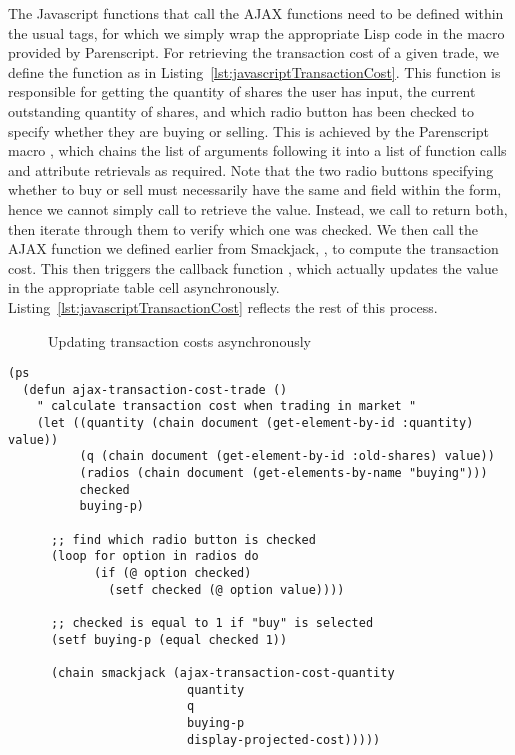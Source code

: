 The Javascript functions that call the AJAX functions need to be defined within
the usual  tags, for which we simply wrap the appropriate Lisp
code in the  macro provided by Parenscript. For retrieving
the transaction cost of a given trade, we define the function
 as in
Listing~\ref{lst:javascriptTransactionCost}. This function is responsible for
getting the quantity of shares the user has input, the current outstanding
quantity of shares, and which radio button has been checked to specify whether
they are buying or selling. This is achieved by the Parenscript macro
, which chains the list of arguments following it into a list of
function calls and attribute retrievals as required. Note that the two radio
buttons specifying whether to buy or sell must necessarily have the same
 and  field within the form, hence we cannot simply call
 to retrieve the value. Instead, we call
 to return both, then iterate through them to verify
which one was checked. We then call the AJAX function we defined earlier from
Smackjack, , to compute the transaction
cost. This then triggers the callback function ,
which actually updates the value in the appropriate table cell asynchronously.
Listing~\ref{lst:javascriptTransactionCost} reflects the rest of this process.

\begin{figure}[htp]

	\caption{Updating transaction costs asynchronously}
\end{figure}

\begin{lstlisting}[float,
	label={lst:javascriptTransactionCost},
	caption={Calling the AJAX function asynchronously}]
(ps
  (defun ajax-transaction-cost-trade ()
	" calculate transaction cost when trading in market "
	(let ((quantity (chain document (get-element-by-id :quantity) value))
		  (q (chain document (get-element-by-id :old-shares) value))
		  (radios (chain document (get-elements-by-name "buying")))
		  checked
		  buying-p)

	  ;; find which radio button is checked
	  (loop for option in radios do
			(if (@ option checked)
			  (setf checked (@ option value))))

	  ;; checked is equal to 1 if "buy" is selected
	  (setf buying-p (equal checked 1))

	  (chain smackjack (ajax-transaction-cost-quantity
						 quantity
						 q
						 buying-p
						 display-projected-cost)))))
\end{lstlisting}

